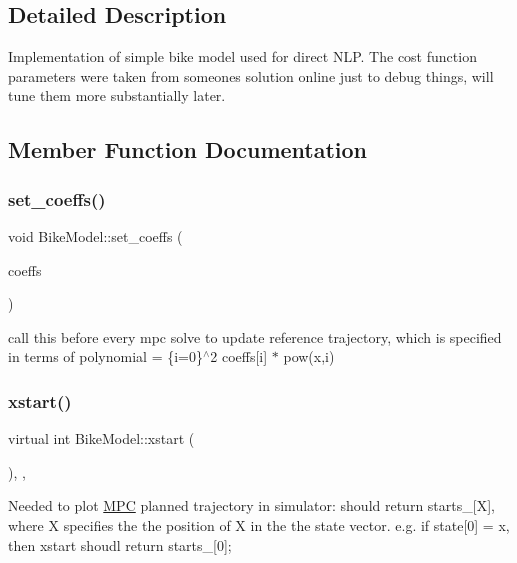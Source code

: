 \subsection{Detailed Description}
Implementation of simple bike model used for direct N\+LP. The cost function parameters were taken from someone\textquotesingle{}s solution online just to debug things, will tune them more substantially later. 

\subsection{Member Function Documentation}
\mbox{\label{classBikeModel_a697e6ec00a4a38ca844c491041cc9b86}} 
\subsubsection{\texorpdfstring{set\+\_\+coeffs()}{set\_coeffs()}}
{\footnotesize\ttfamily void Bike\+Model\+::set\+\_\+coeffs (\begin{DoxyParamCaption}\item[{const Vector\+Xd \&}]{coeffs }\end{DoxyParamCaption})\hspace{0.3cm}{\ttfamily [inline]}}

call this before every mpc solve to update reference trajectory, which is specified in terms of polynomial = \{i=0\}$^\wedge$2 coeffs\mbox{[}i\mbox{]} $\ast$ pow(x,i) \mbox{\label{classBikeModel_a920787379d6fef804f46bc1f3f885a89}} 
\subsubsection{\texorpdfstring{xstart()}{xstart()}}
{\footnotesize\ttfamily virtual int Bike\+Model\+::xstart (\begin{DoxyParamCaption}{ }\end{DoxyParamCaption})\hspace{0.3cm}{\ttfamily [inline]}, {\ttfamily [override]}, {\ttfamily [virtual]}}

Needed to plot \mbox{\hyperlink{classMPC}{M\+PC}} planned trajectory in simulator\+: should return starts\+\_\+\mbox{[}X\mbox{]}, where X specifies the the position of X in the the state vector. e.\+g. if state\mbox{[}0\mbox{]} = x, then xstart shoudl return starts\+\_\+\mbox{[}0\mbox{]}; 

